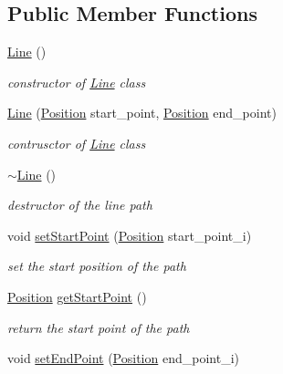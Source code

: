 \subsection*{Public Member Functions}
\begin{DoxyCompactItemize}
\item 
\mbox{\label{class_line_acc11b8a429d8cdd63ba6803dff5602b3}} 
\mbox{\hyperlink{class_line_acc11b8a429d8cdd63ba6803dff5602b3}{Line}} ()
\begin{DoxyCompactList}\small\item\em constructor of \mbox{\hyperlink{class_line}{Line}} class \end{DoxyCompactList}\item 
\mbox{\hyperlink{class_line_a123e1da8ef560bac5ab6b643e25c3d8f}{Line}} (\mbox{\hyperlink{class_position}{Position}} start\+\_\+point, \mbox{\hyperlink{class_position}{Position}} end\+\_\+point)
\begin{DoxyCompactList}\small\item\em contrusctor of \mbox{\hyperlink{class_line}{Line}} class \end{DoxyCompactList}\item 
\mbox{\label{class_line_aabe85f48d22d92b62257091f48174fac}} 
\mbox{\hyperlink{class_line_aabe85f48d22d92b62257091f48174fac}{$\sim$\+Line}} ()
\begin{DoxyCompactList}\small\item\em destructor of the line path \end{DoxyCompactList}\item 
void \mbox{\hyperlink{class_line_a6356eecffc24d5016c9aa697611c3020}{set\+Start\+Point}} (\mbox{\hyperlink{class_position}{Position}} start\+\_\+point\+\_\+i)
\begin{DoxyCompactList}\small\item\em set the start position of the path \end{DoxyCompactList}\item 
\mbox{\hyperlink{class_position}{Position}} \mbox{\hyperlink{class_line_aa9924a540d8ba2da841a414c58dafb56}{get\+Start\+Point}} ()
\begin{DoxyCompactList}\small\item\em return the start point of the path \end{DoxyCompactList}\item 
void \mbox{\hyperlink{class_line_a47359d43675ff78f2b0af8378d952387}{set\+End\+Point}} (\mbox{\hyperlink{class_position}{Position}} end\+\_\+point\+\_\+i)

\end{DoxyCompactItemize}
